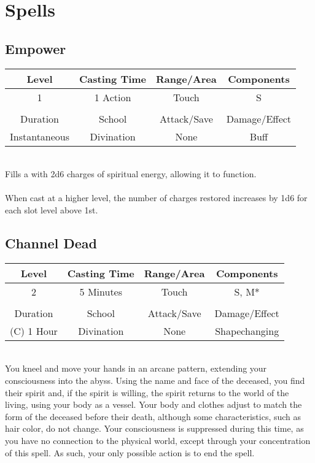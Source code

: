 \section{Spells}
\subsection{Empower}
\label{spells:empower}
\begin{tabular}{c|c|c|c}
Level & Casting Time & Range/Area & Components \\\hline
1 & 1 Action & Touch & S \\
\\
Duration & School & Attack/Save & Damage/Effect \\\hline
Instantaneous & Divination & None & Buff \end{tabular}\\
Fills a  with 2d6 charges of spiritual energy, allowing it to function.\\
\\
When cast at a higher level, the number of charges restored increases by 1d6 for each slot level above 1st. 

\subsection{Channel Dead}
\label{spells:channel}
\begin{tabular}{c|c|c|c}
Level & Casting Time & Range/Area & Components \\\hline
2 & 5 Minutes & Touch & S, M* \\
\\
Duration & School & Attack/Save & Damage/Effect \\\hline
(C) 1 Hour & Divination & None & Shapechanging \end{tabular}\\

You kneel and move your hands in an arcane pattern, extending your consciousness into the abyss. Using the name and face of the deceased, you find their spirit and, if the spirit is willing, the spirit returns to the world of the living, using your body as a vessel. Your body and clothes adjust to match the form of the deceased before their death, although some characteristics, such as hair color, do not change. Your consciousness is suppressed during this time, as you have no connection to the physical world, except through your concentration of this spell. As such, your only possible action is to end the spell.

